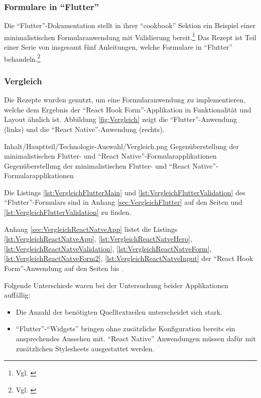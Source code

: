 \subsubsection{Formulare in \enquote{Flutter}}
Die \enquote{Flutter}-Dokumentation stellt in ihrer \enquote{cookbook} Sektion ein Beispiel einer minimalistischen Formularanwendung mit Validierung bereit.\footnote{Vgl. \cite{BuildAFormWithValidation}}
Das Rezept ist Teil einer Serie von insgesamt fünf Anleitungen, welche Formulare in \enquote{Flutter} behandeln.\footnote{Vgl. \cite{FormsFlutter}}

\subsubsection{Vergleich}

Die Rezepte wurden genutzt,
um eine Formularanwendung zu implementieren,
welche dem Ergebnis der \enquote{React Hook Form}-Applikation in Funktionalität und Layout ähnlich ist.
Abbildung \ref{fig:Vergleich} zeigt die \enquote{Flutter}-Anwendung (links) und die \enquote{React Native}-Anwendung (rechts).


\begin{alexfigure}{Inhalt/Hauptteil/Technologie-Auswahl/Vergleich.png}
   {Gegenüberstellung der minimalistischen {Flutter}- und \enquote{React Native}-Formular\-ap\-pli\-ka\-ti\-on\-en}
   {Gegenüberstellung der minimalistischen {Flutter}- und \enquote{React Native}-Formular\-ap\-pli\-ka\-ti\-on\-en}
 
   \label{fig:Vergleich}
 
 \end{alexfigure}

 Die Listings \ref{lst:VergleichFlutterMain} und \ref{lst:VergleichFlutterValidation}
 des \enquote{Flutter}-Formulars sind in Anhang \ref{sec:VergleichFlutter}
 auf den Seiten \pageref{lst:VergleichFlutterMain} und \ref{lst:VergleichFlutterValidation} zu finden.

 Anhang \ref{sec:VergleichReactNatveApp} listet die Listings
 \ref{lst:VergleichReactNatveApp},
 \ref{lst:VergleichReactNatveHero},
 \ref{lst:VergleichReactNatveValidation},
 \ref{lst:VergleichReactNatveForm},
  \ref{lst:VergleichReactNatveForm2},
 \ref{lst:VergleichReactNatveInput} 
 der \enquote{React Hook Form}-Anwendung auf den Seiten \pageref{lst:VergleichReactNatveApp} bis \pageref{lst:VergleichReactNatveInput}.

Folgende Unterschiede waren bei der Untersuchung beider Applikationen auffällig:
\begin{itemize}[topsep=0pt,itemsep=-1ex,partopsep=1ex,parsep=1ex]
   \item Die Anzahl der benötigten Quelltextzeilen unterscheidet sich stark.
   \item \enquote{Flutter}-\enquote{Widgets} bringen ohne zusätzliche Konfiguration bereits ein ansprechendes Aussehen mit. \enquote{React Native} Anwendungen müssen dafür mit zusätzlichen Stylesheets ausgestattet werden. 
\end{itemize}

